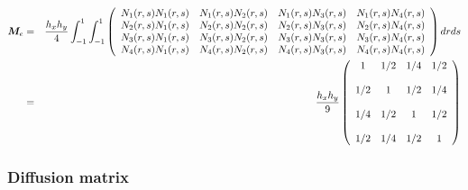 \begin{eqnarray}
{\bm M}_e 
&=&   \frac{h_xh_y}{4} \int_{-1}^1 \int_{-1}^{1}
\left(
\begin{array}{cccc}
N_1(r,s)N_1(r,s) &  N_1(r,s)N_2(r,s) &  N_1(r,s)N_3(r,s) & N_1(r,s)N_4(r,s) \\
N_2(r,s)N_1(r,s) &  N_2(r,s)N_2(r,s) &  N_2(r,s)N_3(r,s) & N_2(r,s)N_4(r,s) \\
N_3(r,s)N_1(r,s) &  N_3(r,s)N_2(r,s) &  N_3(r,s)N_3(r,s) & N_3(r,s)N_4(r,s) \\
N_4(r,s)N_1(r,s) &  N_4(r,s)N_2(r,s) &  N_4(r,s)N_3(r,s) & N_4(r,s)N_4(r,s) 
\end{array}
\right)
dr ds\nonumber\\
&=&
\frac{h_x h_y}{9}
\left(
\begin{array}{cccc}
1 & 1/2 & 1/4 & 1/2 \\ \\ 
1/2 & 1   & 1/2 & 1/4 \\ \\
1/4 & 1/2 & 1 & 1/2 \\ \\
1/2 & 1/4 & 1/2 & 1  
\end{array}
\right)
\end{eqnarray}

\subsubsection{Diffusion matrix}


